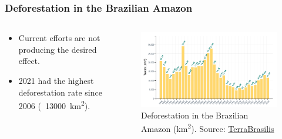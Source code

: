 \documentclass[aspectratio=169]{beamer}
\begin{document}
\begin{frame}
  \frametitle{Deforestation in the Brazilian Amazon}
  \begin{columns}
    \begin{column}{0.4\textwidth}
      \begin{itemize}
        \item Current efforts are not producing the desired effect.
        \item 2021 had the highest deforestation rate since 2006 
          (~13000~\si{km^{2}}).
      \end{itemize}
    \end{column}
    \begin{column}{0.6\textwidth}
      \begin{figure}
        \centering
        \includegraphics[width=1.0\textwidth]
        {img/prodes_deforestation_rate.png}
        \caption{Deforestation in the Brazilian Amazon (\si{\km^{2}}). Source: 
        \href{http://terrabrasilis.dpi.inpe.br/en/home-page/}{TerraBrasilis}}
        \label{fig:prodes_deforestation_rate}
      \end{figure}
    \end{column}
  \end{columns}
\end{frame}
\end{document}
